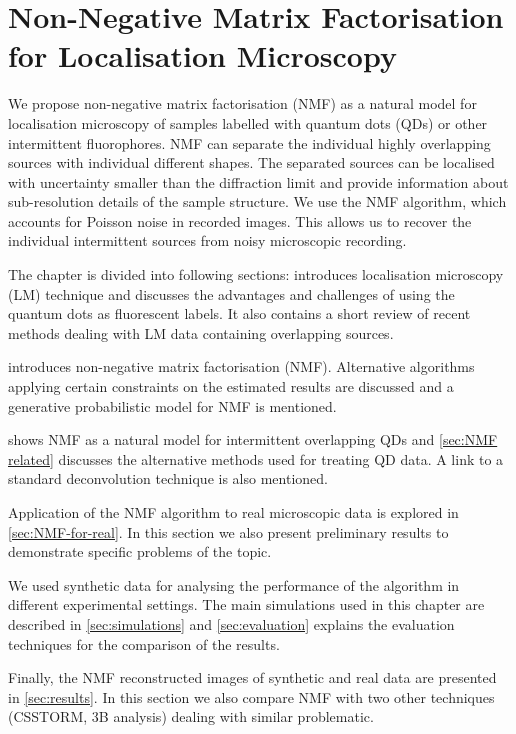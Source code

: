 \chapter{Non-Negative Matrix Factorisation for Localisation Microscopy\label{ch:NMF}}

We propose non-negative matrix factorisation (NMF) as a natural model for localisation microscopy of samples labelled with quantum dots (QDs) or other intermittent fluorophores. NMF can separate the individual highly overlapping sources with individual different shapes. The separated sources can be localised with uncertainty smaller than the diffraction limit and provide information about sub-resolution details of the sample structure. We use the NMF algorithm, which accounts for Poisson noise in recorded images. This allows us to recover the individual intermittent sources from noisy microscopic recording.

The chapter is divided into following sections:  introduces localisation microscopy (LM) technique and discusses the advantages and challenges of using the quantum dots as fluorescent labels. It also contains a short review of recent methods dealing with LM data containing overlapping sources. 

 introduces non-negative matrix factorisation (NMF). Alternative algorithms applying certain constraints on the estimated results are discussed and a generative probabilistic model for NMF is mentioned.

 shows NMF as a natural model for intermittent overlapping QDs and \autoref{sec:NMF related} discusses the alternative methods used for treating QD data. A link to a standard deconvolution technique is also mentioned. 

Application of the NMF algorithm to real microscopic data is explored in \autoref{sec:NMF-for-real}. In this section we also present preliminary results to demonstrate specific problems of the topic.

We used synthetic data for analysing the performance of the algorithm in different experimental settings. The main simulations used in this chapter are described in \autoref{sec:simulations} and \autoref{sec:evaluation} explains the evaluation techniques for the comparison of the results.

Finally, the NMF reconstructed images of synthetic and real data are presented in \autoref{sec:results}. In this section we also compare NMF with two other techniques (CSSTORM, 3B analysis) dealing with similar problematic. 

